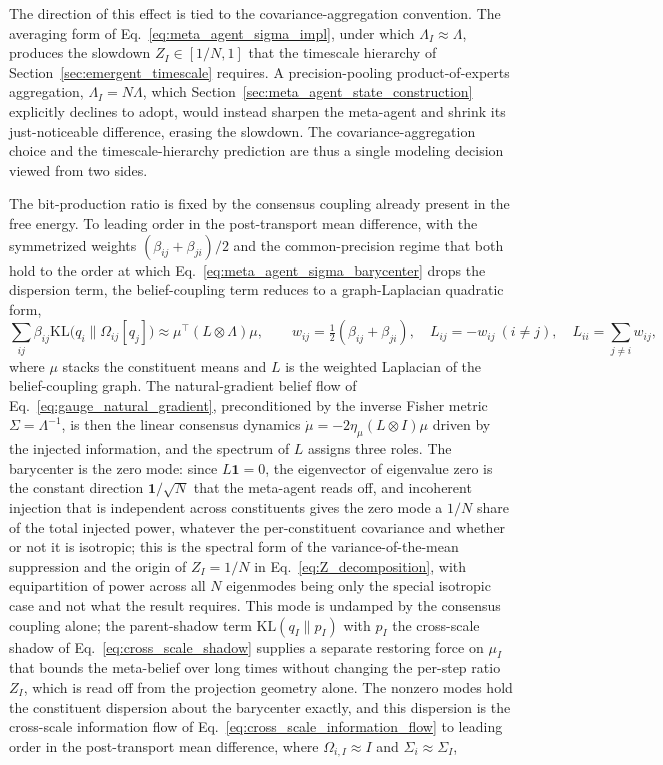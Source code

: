 \documentclass[11pt]{article}
\begin{document}
The direction of this effect is tied to the covariance-aggregation convention. The averaging form of Eq.~\eqref{eq:meta_agent_sigma_impl}, under which $\Lambda_I \approx \Lambda$, produces the slowdown $Z_I \in [1/N, 1]$ that the timescale hierarchy of Section~\ref{sec:emergent_timescale} requires. A precision-pooling product-of-experts aggregation, $\Lambda_I = N\Lambda$, which Section~\ref{sec:meta_agent_state_construction} explicitly declines to adopt, would instead sharpen the meta-agent and shrink its just-noticeable difference, erasing the slowdown. The covariance-aggregation choice and the timescale-hierarchy prediction are thus a single modeling decision viewed from two sides.

The bit-production ratio is fixed by the consensus coupling already present in the free energy. To leading order in the post-transport mean difference, with the symmetrized weights $(\beta_{ij}+\beta_{ji})/2$ and the common-precision regime that both hold to the order at which Eq.~\eqref{eq:meta_agent_sigma_barycenter} drops the dispersion term, the belief-coupling term reduces to a graph-Laplacian quadratic form,
\begin{equation}
\sum_{ij}\beta_{ij}\mathrm{KL}\big(q_i \| \Omega_{ij}[q_j]\big) \approx \mu^\top (L \otimes \Lambda)\mu,
\qquad
w_{ij} = \tfrac{1}{2}(\beta_{ij}+\beta_{ji}),\quad L_{ij} = -w_{ij}\ (i\neq j),\quad L_{ii} = \sum_{j\neq i}w_{ij},
\label{eq:coupling_laplacian}
\end{equation}
where $\mu$ stacks the constituent means and $L$ is the weighted Laplacian of the belief-coupling graph. The natural-gradient belief flow of Eq.~\eqref{eq:gauge_natural_gradient}, preconditioned by the inverse Fisher metric $\Sigma = \Lambda^{-1}$, is then the linear consensus dynamics $\dot\mu = -2\eta_\mu (L\otimes I)\mu$ driven by the injected information, and the spectrum of $L$ assigns three roles. The barycenter is the zero mode: since $L\mathbf{1} = 0$, the eigenvector of eigenvalue zero is the constant direction $\mathbf{1}/\sqrt{N}$ that the meta-agent reads off, and incoherent injection that is independent across constituents gives the zero mode a $1/N$ share of the total injected power, whatever the per-constituent covariance and whether or not it is isotropic; this is the spectral form of the variance-of-the-mean suppression and the origin of $Z_I = 1/N$ in Eq.~\eqref{eq:Z_decomposition}, with equipartition of power across all $N$ eigenmodes being only the special isotropic case and not what the result requires. This mode is undamped by the consensus coupling alone; the parent-shadow term $\mathrm{KL}(q_I \| p_I)$ with $p_I$ the cross-scale shadow of Eq.~\eqref{eq:cross_scale_shadow} supplies a separate restoring force on $\mu_I$ that bounds the meta-belief over long times without changing the per-step ratio $Z_I$, which is read off from the projection geometry alone. The nonzero modes hold the constituent dispersion about the barycenter exactly, and this dispersion is the cross-scale information flow of Eq.~\eqref{eq:cross_scale_information_flow} to leading order in the post-transport mean difference, where $\Omega_{i,I}\approx I$ and $\Sigma_i\approx\Sigma_I$,
\end{document}
